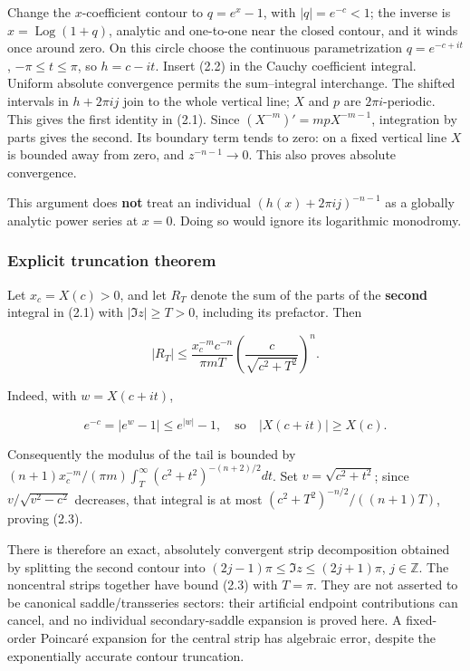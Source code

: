\documentclass[11pt,letterpaper]{article}
\newcommand{\Log}{\operatorname{Log}}
\numberwithin{equation}{subsection}
\theoremstyle{definition}
\theoremstyle{remark}
\theoremstyle{plain}
\begin{document}
Change the \(x\)-coefficient contour to \(q=e^x-1\), with \(|q|=e^{-c}<1\); the inverse is \(x=\Log(1+q)\), analytic and one-to-one near the closed contour, and it winds once around zero. On this circle choose the continuous parametrization \(q=e^{-c+it}\), \(-\pi\le t\le\pi\), so \(h=c-it\). Insert (2.2) in the Cauchy coefficient integral. Uniform absolute convergence permits the sum--integral interchange. The shifted intervals in \(h+2\pi i j\) join to the whole vertical line; \(X\) and \(p\) are \(2\pi i\)-periodic. This gives the first identity in (2.1). Since \((X^{-m})'=m p X^{-m-1}\), integration by parts gives the second. Its boundary term tends to zero: on a fixed vertical line \(X\) is bounded away from zero, and \(z^{-n-1}\to0\). This also proves absolute convergence.

This argument does \textbf{not} treat an individual \((h(x)+2\pi i j)^{-n-1}\) as a globally analytic power series at \(x=0\). Doing so would ignore its logarithmic monodromy.

\subsubsection{Explicit truncation theorem}\label{a122:explicit-truncation-theorem}

Let \(x_c=X(c)>0\), and let \(R_T\) denote the sum of the parts of the \textbf{second} integral in (2.1) with \(|\Im z|\ge T>0\), including its prefactor. Then

\[
 |R_T|\le\frac{x_c^{-m}c^{-n}}{\pi m T}
 \left(\frac{c}{\sqrt{c^2+T^2}}\right)^n.\tag{2.3}
\]

Indeed, with \(w=X(c+it)\),

\[
 e^{-c}=|e^w-1|\le e^{|w|}-1,
 \quad\text{so}\quad |X(c+it)|\ge X(c).
\]

Consequently the modulus of the tail is bounded by \((n+1)x_c^{-m}/(\pi m)\int_T^\infty(c^2+t^2)^{-(n+2)/2}dt\). Set \(v=\sqrt{c^2+t^2}\); since \(v/\sqrt{v^2-c^2}\) decreases, that integral is at most \((c^2+T^2)^{-n/2}/((n+1)T)\), proving (2.3).

There is therefore an exact, absolutely convergent strip decomposition obtained by splitting the second contour into \((2j-1)\pi\le\Im z\le(2j+1)\pi\), \(j\in\mathbb Z\). The noncentral strips together have bound (2.3) with \(T=\pi\). They are not asserted to be canonical saddle/transseries sectors: their artificial endpoint contributions can cancel, and no individual secondary-saddle expansion is proved here. A fixed-order Poincaré expansion for the central strip has algebraic error, despite the exponentially accurate contour truncation.
\end{document}
